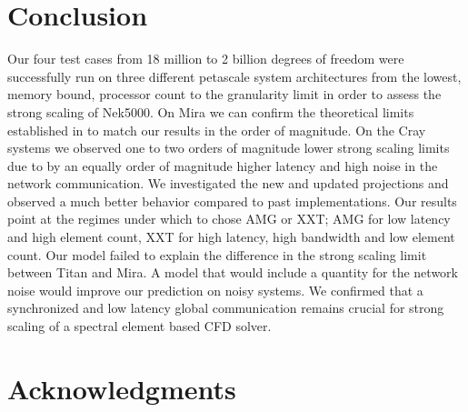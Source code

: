 \documentclass{sig-alternate}
\begin{document}
\section{Conclusion}
Our four test cases from 18 million to 2 billion degrees of freedom were
successfully run on three different petascale system architectures from the
lowest, memory bound, processor count to the granularity limit in order to
assess the strong scaling of Nek5000. On Mira we can confirm the theoretical
limits established in \cite{fischer:scaling} to match our results in the order
of magnitude. On the Cray systems we observed one to two orders of magnitude
lower strong scaling limits due to by an equally order of magnitude higher
latency and high noise in the network communication. We investigated the new
and updated projections and observed a much better behavior compared to past
implementations. Our results point at the regimes under which to chose AMG or
XXT; AMG for low latency and high element count, XXT for high latency, high
bandwidth and low element count. Our model failed to explain the difference in
the strong scaling limit between Titan and Mira. A model that would include a
quantity for the network noise would improve our prediction on noisy systems.
We confirmed that a synchronized and low latency global communication remains
crucial for strong scaling of a spectral element based CFD solver.

\section{Acknowledgments}

%

%
%

\end{document}
